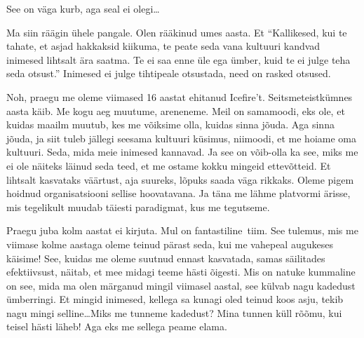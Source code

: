 See on väga kurb, aga seal ei olegi\ldots 

Ma siin räägin ühele pangale. Olen rääkinud umes aasta. Et \enquote{Kallikesed, kui te tahate, et asjad hakkaksid kiikuma, te peate seda vana kultuuri kandvad inimesed lihtsalt ära saatma. Te ei saa enne üle ega ümber, kuid te ei julge teha seda otsust.} Inimesed ei julge tihtipeale otsustada, need on rasked otsused. 


Noh, praegu me oleme viimased 16 aastat ehitanud Icefire't. Seitsmeteistkümnes aasta käib. Me kogu aeg muutume, areneneme. Meil on samamoodi, eks ole, et kuidas maailm muutub, kes me võiksime olla, kuidas sinna jõuda. Aga  sinna jõuda, ja siit tuleb jällegi seesama kultuuri küsimus, niimoodi, et  me hoiame oma kultuuri. Seda, mida meie inimesed kannavad. Ja see on võib-olla ka see, miks me ei ole näiteks läinud seda teed, et me ostame kokku mingeid  ettevõtteid. Et lihtsalt kasvataks väärtust, aja suureks, lõpuks saada väga rikkaks. Oleme pigem hoidnud organisatsiooni sellise hoovatavana. Ja täna me lähme platvormi ärisse, mis tegelikult muudab täiesti paradigmat, kus me tegutseme. 


Praegu juba kolm aastat ei kirjuta. Mul on fantastiline tiim. See tulemus, mis me viimase kolme aastaga oleme teinud pärast seda, kui me vahepeal augukeses käisime! See, kuidas me oleme suutnud ennast kasvatada, samas säilitades efektiivsust, näitab, et mee midagi teeme hästi õigesti. Mis on natuke kummaline on see, mida ma olen märganud mingil viimasel aastal, see külvab nagu kadedust ümberringi. Et mingid inimesed, kellega sa  kunagi oled teinud koos asju, tekib nagu mingi selline\ldots Miks me tunneme kadedust? Mina tunnen küll rõõmu, kui teisel hästi läheb! Aga eks me sellega peame  elama. 